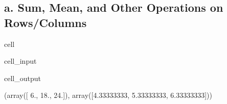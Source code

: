 \documentclass[letterpaper,10pt,english]{jupyterBook}
\begin{document}
\subsection{a. Sum, Mean, and Other Operations on Rows/Columns}
\label{\detokenize{lessons/Intro_to_Matrices_in_NumPy:a-sum-mean-and-other-operations-on-rows-columns}}
\begin{sphinxuseclass}{cell}\begin{sphinxVerbatimInput}

\begin{sphinxuseclass}{cell_input}
\begin{sphinxVerbatim}[commandchars=\\\{\}]
   

   

 
\end{sphinxVerbatim}

\end{sphinxuseclass}\end{sphinxVerbatimInput}
\begin{sphinxVerbatimOutput}

\begin{sphinxuseclass}{cell_output}
\begin{sphinxVerbatim}[commandchars=\\\{\}]
(array([ 6., 18., 24.]), array([4.33333333, 5.33333333, 6.33333333]))
\end{sphinxVerbatim}

\end{sphinxuseclass}\end{sphinxVerbatimOutput}

\end{sphinxuseclass}
\end{document}
